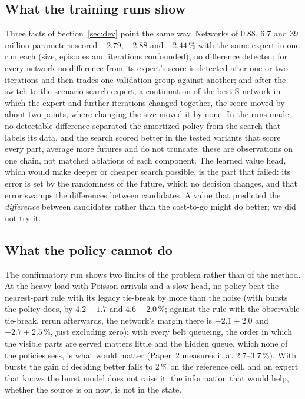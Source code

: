 \documentclass[11pt,a4paper]{article}
\theoremstyle{plain}
\theoremstyle{definition}
\theoremstyle{remark}
\begin{document}
\subsection{What the training runs show}
Three facts of Section~\ref{sec:dev} point the same way. Networks of 0.88, 6.7 and 39
million parameters scored $-2.79$, $-2.88$ and $-2.44$\,\% with the same expert in one
run each (size, episodes and iterations confounded), no difference detected; for every network no difference from its expert's score is detected after one or two iterations and then trades one validation group against
another; and after the switch to the scenario-search expert, a continuation of the best S
network in which the expert and further iterations changed together, the score moved by
about two points, where changing the size moved it by none. In the runs made, no detectable difference separated the amortized
policy from the search that labels its data, and the search scored better in the tested variants that score
every part, average more futures and do not truncate; these are observations on one
chain, not matched ablations of each component. The learned value
head, which would make deeper or cheaper search possible, is the part that failed: its
error is set by the randomness of the future, which no decision changes, and that error
swamps the differences between candidates. A value that predicted the \emph{difference}
between candidates rather than the cost-to-go might do better; we did not try it.

\subsection{What the policy cannot do}
The confirmatory run shows two limits of the problem rather than of the method. At the
heavy load with Poisson arrivals and a slow head, no policy beat the nearest-part rule with
its legacy tie-break by more than the noise (with bursts the policy does, by $4.2\pm1.7$ and
$4.6\pm2.0$\,\%; against the rule with the observable tie-break, rerun afterwards, the
network's margin there is $-2.1\pm2.0$ and $-2.7\pm2.5$\,\%, just excluding zero):
with every belt queueing, the order in which the visible parts are served matters little
and the hidden queue, which none of the policies sees, is what would matter (Paper~2
measures it at 2.7--3.7\,\%). With bursts the gain of deciding better falls to 2\,\% on
the reference cell, and an expert that knows the burst model does not raise it: the
information that would help, whether the source is on now, is not in the state.
\end{document}
